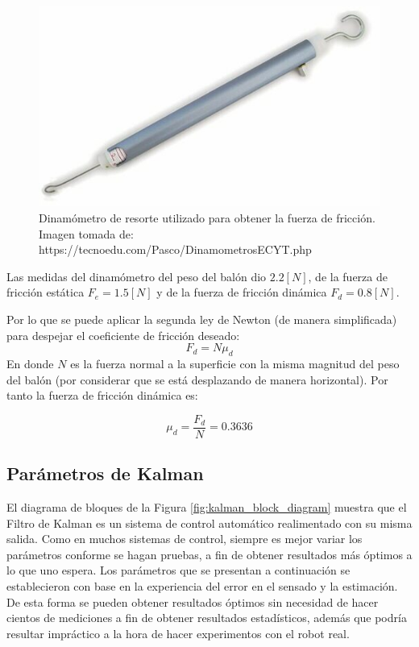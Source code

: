 \begin{figure}
\centering
\includegraphics[scale=0.4]{images/dynamometer.jpg}
\caption{Dinamómetro de resorte utilizado para obtener la fuerza de fricción. Imagen tomada de: https://tecnoedu.com/Pasco/DinamometrosECYT.php}
\label{fig:dynamometer}
\end{figure}	

	Las medidas del dinamómetro del peso del balón dio $2.2[N]$, de la fuerza de fricción estática $F_{e} = 1.5[N]$ y de la fuerza de fricción dinámica $F_{d} = 0.8[N]$. 

	Por lo que se puede aplicar la segunda ley de Newton (de manera simplificada) para despejar el coeficiente de fricción deseado:
\begin{equation}
F_d = N\mu_d 
\end{equation}
	En donde $N$ es la fuerza normal a la superficie con la misma magnitud del peso del balón (por considerar que se está desplazando de manera horizontal). Por tanto la fuerza de fricción dinámica es:
	
\begin{equation}
	\mu_d = \frac{F_d}{N}
	      = 0.3636		
	\label{eq:mu_d}
\end{equation}
	
		\subsection*{Parámetros de Kalman}
		El diagrama de bloques de la Figura \ref{fig:kalman_block_diagram} muestra que el Filtro de Kalman es un sistema de control automático realimentado con su misma salida. Como en muchos sistemas de control, siempre es mejor variar los parámetros conforme se hagan pruebas, a fin de obtener resultados más óptimos a lo que uno espera. Los parámetros que se presentan a continuación se establecieron con base en la experiencia del error en el sensado y la estimación. De esta forma se pueden obtener resultados óptimos sin necesidad de hacer cientos de mediciones a fin de obtener resultados estadísticos, además que podría resultar impráctico a la hora de hacer experimentos con el robot real.
		


